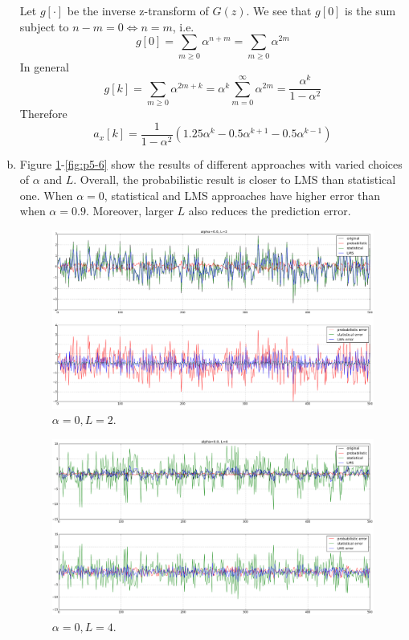\begin{enumerate}[(a)]
Let $g[\cdot]$ be the inverse z-transform of $G(z)$. We see that $g[0]$ is the sum subject to $n - m = 0 \Leftrightarrow n = m$, i.e.
\[g[0] = \sum_{m \geq 0} \alpha^{n+m} = \sum_{m \geq 0} \alpha^{2m}\]
In general
\[g[k] = \sum_{m \geq 0} \alpha^{2m+k} = \alpha^k \sum_{m=0}^{\infty} \alpha^{2m} = \frac{\alpha^k}{1- \alpha^2}\]
Therefore
\[	a_x[k] = \frac{1}{1- \alpha^2} (1.25 \alpha^{k} - 0.5 \alpha^{k+1} - 0.5 \alpha^{k-1}) \]

\item Figure \ref{fig:p5-1}-\ref{fig:p5-6} show the results of different approaches with varied choices of $\alpha$ and $L$. Overall, the probabilistic result is closer to LMS than statistical one. When $\alpha = 0$, statistical and LMS approaches have higher error than when $\alpha = 0.9$. Moreover, larger $L$ also reduces the prediction error.
\begin{figure}[htbp]
	\centering
	\includegraphics[width=\textwidth]{images/p5-1}
	\caption{$\alpha=0, L=2$.}
	\label{fig:p5-1}
\end{figure}

\begin{figure}[htbp]
	\centering
	\includegraphics[width=\textwidth]{images/p5-2}
	\caption{$\alpha=0, L=4$.}
	\label{fig:p5-2}
\end{figure}


\end{enumerate}
